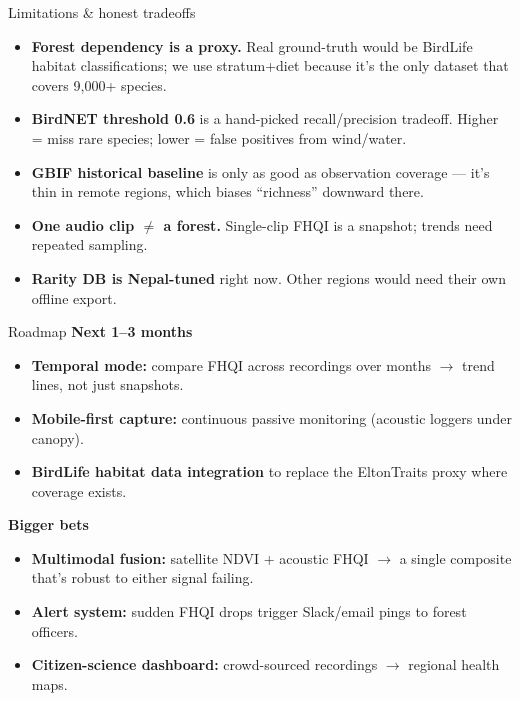 \documentclass[aspectratio=169]{beamer}
\begin{document}
\begin{frame}{Limitations \& honest tradeoffs}
  \begin{itemize}
    \item \textbf{Forest dependency is a proxy.} Real ground-truth would be BirdLife habitat classifications; we use stratum+diet because it's the only dataset that covers 9{,}000+ species.
    \item \textbf{BirdNET threshold 0.6} is a hand-picked recall/precision tradeoff. Higher = miss rare species; lower = false positives from wind/water.
    \item \textbf{GBIF historical baseline} is only as good as observation coverage --- it's thin in remote regions, which biases ``richness'' downward there.
    \item \textbf{One audio clip $\neq$ a forest.} Single-clip FHQI is a snapshot; trends need repeated sampling.
    \item \textbf{Rarity DB is Nepal-tuned} right now. Other regions would need their own offline export.
  \end{itemize}
\end{frame}

\begin{frame}{Roadmap}
  \textbf{Next 1--3 months}
  \begin{itemize}
    \item \textbf{Temporal mode:} compare FHQI across recordings over months $\rightarrow$ trend lines, not just snapshots.
    \item \textbf{Mobile-first capture:} continuous passive monitoring (acoustic loggers under canopy).
    \item \textbf{BirdLife habitat data integration} to replace the EltonTraits proxy where coverage exists.
  \end{itemize}
  \vspace{0.4em}
  \textbf{Bigger bets}
  \begin{itemize}
    \item \textbf{Multimodal fusion:} satellite NDVI + acoustic FHQI $\rightarrow$ a single composite that's robust to either signal failing.
    \item \textbf{Alert system:} sudden FHQI drops trigger Slack/email pings to forest officers.
    \item \textbf{Citizen-science dashboard:} crowd-sourced recordings $\rightarrow$ regional health maps.
  \end{itemize}
\end{frame}
\end{document}
